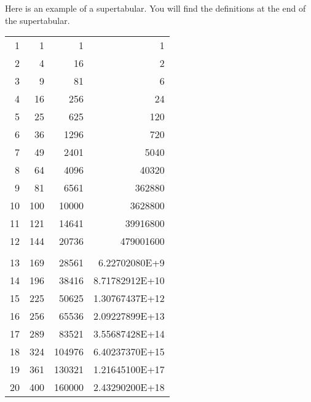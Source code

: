 Here is an example of a supertabular. You will find the definitions at
the end of the supertabular.
\begin{center}
\tablelasttail{\hline}
\par
\begin{supertabular}{| r@{\hspace{6.5mm}}| r@{\hspace{5.5mm}}| r | r|}
1   &     1  &        1  &           1    \\
2   &     4  &       16  &           2    \\
3   &     9  &       81  &           6    \\
4   &    16  &      256  &          24    \\[5mm]
5   &    25  &      625  &         120    \\
6   &    36  &     1296  &         720    \\
7   &    49  &     2401  &        5040    \\
8   &    64  &     4096  &       40320    \\
9   &    81  &     6561  &      362880    \\
10  &   100  &    10000  &     3628800    \\
11  &   121  &    14641  &    39916800    \\
12  &   144  &    20736  &   479001600    \\[.5cm]
\hline & & & \\
13  &   169  &    28561  &  6.22702080E+9 \\[1cm]
14  &   196  &    38416  &  8.71782912E+10\\
15  &   225  &    50625  &  1.30767437E+12\\
16  &   256  &    65536  &  2.09227899E+13\\
17  &   289  &    83521  &  3.55687428E+14\\[5mm]
18  &   324  &   104976  &  6.40237370E+15\\
19  &   361  &   130321  &  1.21645100E+17\\
20  &   400  &   160000  &  2.43290200E+18\\
\end{supertabular}
\end{center}

